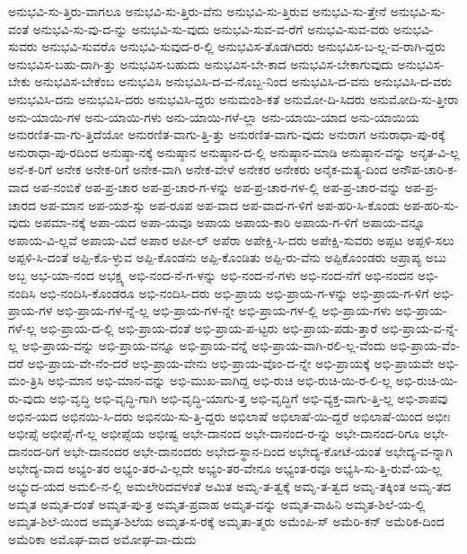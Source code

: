 {ಅನುಭವಿ-ಸು-ತ್ತಿರು-ವಾಗಲೂ
ಅನುಭವಿ-ಸು-ತ್ತಿರು-ವೆನು
ಅನುಭವಿ-ಸು-ತ್ತಿರುವ
ಅನುಭವಿ-ಸು-ತ್ತೇನೆ
ಅನುಭವಿ-ಸು-ವಂತೆ
ಅನುಭವಿ-ಸು-ವು-ದ-ನ್ನು
ಅನುಭವಿ-ಸು-ವುದು
ಅನುಭವಿ-ಸುವ-ವ-ರೆಗೆ
ಅನುಭವಿ-ಸುವ-ವರು
ಅನುಭವಿ-ಸುವರು
ಅನುಭವಿ-ಸುವರೊ
ಅನುಭವಿ-ಸುವುದ-ರ-ಲ್ಲಿ
ಅನುಭವಿಸ-ತೊಡಗಿದರು
ಅನುಭವಿಸ-ಬ-ಲ್ಲ-ವ-ರಾಗಿ-ದ್ದರು
ಅನುಭವಿಸ-ಬಹು-ದಾಗಿ-ತ್ತು
ಅನುಭವಿಸ-ಬಹುದು
ಅನುಭವಿಸ-ಬೇ-ಕಾದ
ಅನುಭವಿಸ-ಬೇಕಾಗುವುದು
ಅನುಭವಿಸ-ಬೇಕು
ಅನುಭವಿಸ-ಬೇಕೆಂಬ
ಅನುಭವಿಸಿ
ಅನುಭವಿಸಿ-ದ-ವ-ನೊಬ್ಬ-ನಿಂದ
ಅನುಭವಿಸಿ-ದ-ವನು
ಅನುಭವಿಸಿ-ದ-ವರು
ಅನುಭವಿಸಿ-ದನು
ಅನುಭವಿಸಿ-ದರು
ಅನುಭವಿಸಿ-ದ್ದರು
ಅನುಮಂಶಿ-ಕತೆ
ಅನುಮೋ-ದಿ-ಸಿದರು
ಅನುಮೋದಿ-ಸು-ತ್ತೀರಾ
ಅನು-ಯಾಯಿ-ಗಳ
ಅನು-ಯಾಯಿ-ಗಳು
ಅನು-ಯಾಯಿ-ಗಳೆ-ಲ್ಲಾ
ಅನು-ಯಾಯಿ-ಯಾದ
ಅನು-ಯಾಯಿಯ
ಅನುರಣಿತ-ವಾ-ಗು-ತ್ತಿದೆಯೋ
ಅನುರಣಿತ-ವಾಗು-ತ್ತಿ-ತ್ತು
ಅನುರಣಿತ-ವಾಗು-ವುದು
ಅನುರಾಗ
ಅನುರಾಧಾ-ಪು-ರಕ್ಕೆ
ಅನುರಾಧಾ-ಪು-ರದಿಂದ
ಅನುಷ್ಠಾ-ನಕ್ಕೆ
ಅನುಷ್ಠಾನ
ಅನುಷ್ಠಾನ-ದ-ಲ್ಲಿ
ಅನುಷ್ಠಾನ-ಮಾಡಿ
ಅನುಷ್ಠಾನ-ವನ್ನು
ಅನೃತ-ವಿ-ಲ್ಲ
ಅನೆ-ಕ-ರಿಗೆ
ಅನೇಕ
ಅನೇಕ-ರಿಗೆ
ಅನೇಕ-ವಾಗಿ
ಅನೇಕ-ವೇಳೆ
ಅನೇಕರ
ಅನೇಕರು
ಅನೈಕ-ಮತ್ಯ-ದಿಂದ
ಅನೌಪ-ಚಾರಿ-ಕ-ವಾದ
ಅಪ-ನಂಬಿಕೆ
ಅಪ-ಪ್ರ-ಚಾರ
ಅಪ-ಪ್ರ-ಚಾರ-ಗ-ಳನ್ನು
ಅಪ-ಪ್ರ-ಚಾರ-ಗಳ-ಲ್ಲಿ
ಅಪ-ಪ್ರ-ಚಾರ-ವನ್ನು
ಅಪ-ಪ್ರ-ಚಾರದ
ಅಪ-ಮಾನ
ಅಪ-ಯಶ-ಸ್ಸು
ಅಪ-ರೂಪ
ಅಪ-ವಾದ
ಅಪ-ವಾದ-ಗ-ಳಿಗೆ
ಅಪ-ಹರಿ-ಸಿ-ಕೊಂಡು
ಅಪ-ಹರಿ-ಸು-ವುದು
ಅಪಮಾ-ನಕ್ಕೆ
ಅಪಾ-ಯದ
ಅಪಾ-ಯವೂ
ಅಪಾಯ
ಅಪಾಯ-ಕಾರಿ
ಅಪಾಯ-ಗ-ಳಿಗೆ
ಅಪಾಯ-ವನ್ನೂ
ಅಪಾಯ-ವಿ-ಲ್ಲವೆ
ಅಪಾಯ-ವಿದೆ
ಅಪಾರ
ಅಪೀ-ಲ್
ಅಪೆರಾ
ಅಪೇಕ್ಷಿ-ಸಿ-ದರು
ಅಪೇಕ್ಷಿ-ಸುವರು
ಅಪ್ಪಟ
ಅಪ್ಪಳಿ-ಸಲು
ಅಪ್ಪಳಿ-ಸಿ-ದಂತೆ
ಅಪ್ಪಿ-ಕೊ-ಳ್ಳುವ
ಅಪ್ಪಿ-ಕೊಂಡನು
ಅಪ್ಪಿ-ಕೊಂಡಿತು
ಅಪ್ಪಿ-ರು-ವೆನು
ಅಪ್ಪಿಕೊಂಂಡರು
ಅಪ್ರಾಪ್ಯ
ಅಬು
ಅಬ್ಬ
ಅಭ-ಯಾ-ನಂದ
ಅಭಕ್ಷ್ಯ
ಅಭಿ-ನಂದ-ನೆ-ಗ-ಳನ್ನು
ಅಭಿ-ನಂದ-ನೆ-ಗಳು
ಅಭಿ-ನಂದ-ನೆಗೆ
ಅಭಿ-ನಂದನ
ಅಭಿ-ನಂದಿಸಿ
ಅಭಿ-ನಂದಿಸಿ-ಕೊಂಡರೂ
ಅಭಿ-ನಂದಿಸಿ-ದರು
ಅಭಿ-ಪ್ರಾಯ
ಅಭಿ-ಪ್ರಾಯ-ಗ-ಳನ್ನು
ಅಭಿ-ಪ್ರಾಯ-ಗ-ಳಿಗೆ
ಅಭಿ-ಪ್ರಾಯ-ಗಳ
ಅಭಿ-ಪ್ರಾಯ-ಗಳ-ನ್ನೆ-ಲ್ಲ
ಅಭಿ-ಪ್ರಾಯ-ಗಳ-ನ್ನೇ
ಅಭಿ-ಪ್ರಾಯ-ಗಳ-ಲ್ಲಿ
ಅಭಿ-ಪ್ರಾಯ-ಗಳು
ಅಭಿ-ಪ್ರಾಯ-ಗಳೆ-ಲ್ಲ
ಅಭಿ-ಪ್ರಾಯ-ದ-ಲ್ಲಿ
ಅಭಿ-ಪ್ರಾಯ-ದಂತೆ
ಅಭಿ-ಪ್ರಾಯ-ಪ-ಟ್ಟರು
ಅಭಿ-ಪ್ರಾಯ-ಪಡು-ತ್ತಾರೆ
ಅಭಿ-ಪ್ರಾಯ-ವ-ನ್ನೆ-ಲ್ಲ
ಅಭಿ-ಪ್ರಾಯ-ವನ್ನು
ಅಭಿ-ಪ್ರಾಯ-ವನ್ನೂ
ಅಭಿ-ಪ್ರಾಯ-ವನ್ನೆ
ಅಭಿ-ಪ್ರಾಯ-ವಾಗಿ-ರಲಿ-ಲ್ಲ-ವೆಂದು
ಅಭಿ-ಪ್ರಾಯ-ವೆಂ-ದರೆ
ಅಭಿ-ಪ್ರಾಯ-ವೇ-ನೆಂ-ದರೆ
ಅಭಿ-ಪ್ರಾಯ-ವೇನು
ಅಭಿ-ಪ್ರಾಯ-ವೊಂ-ದ-ನ್ನೇ
ಅಭಿ-ಪ್ರಾಯಕ್ಕೆ
ಅಭಿ-ಪ್ರಾಯವೇ
ಅಭಿ-ಮಂ-ತ್ರಿಸಿ
ಅಭಿ-ಮಾನ
ಅಭಿ-ಮಾನ-ವನ್ನು
ಅಭಿ-ಮುಖ-ವಾಗಿದ್ದ
ಅಭಿ-ರುಚಿ
ಅಭಿ-ರುಚಿ-ಯಿ-ರ-ಲಿ-ಲ್ಲ
ಅಭಿ-ರುಚಿ-ಯಿ-ರು-ವುದು
ಅಭಿ-ವೃದ್ಧಿ
ಅಭಿ-ವೃದ್ಧಿ-ಗಾಗಿ
ಅಭಿ-ವೃದ್ಧಿ-ಯಾಗು-ತ್ತ
ಅಭಿ-ವೃದ್ಧಿಗೆ
ಅಭಿ-ವ್ಯಕ್ತ-ವಾಗು-ತ್ತಿ-ಲ್ಲ
ಅಭಿ-ಶಾಪವು
ಅಭಿನ-ಯದ
ಅಭಿನಯಿ-ಸಿ-ದರು
ಅಭಿನಯಿ-ಸು-ತ್ತಿ-ದ್ದರು
ಅಭಿಲಾಷೆ
ಅಭಿಲಾಷೆ-ಯಿ-ದ್ದರೆ
ಅಭಿಲಾಷೆ-ಯಿಂದ
ಅಭೀಃ
ಅಭೀಪ್ಸೆ
ಅಭೀಪ್ಸೆ-ಗೆ-ಲ್ಲ
ಅಭೀಪ್ಸೆಯ
ಅಭೀಷ್ಟ
ಅಭೇ-ದಾನಂದ
ಅಭೇ-ದಾನಂದ-ರ-ನ್ನು
ಅಭೇ-ದಾನಂದ-ರಿಗೂ
ಅಭೇ-ದಾನಂದ-ರಿಗೆ
ಅಭೇ-ದಾನಂದರ
ಅಭೇ-ದಾನಂದರು
ಅಭೇದ-ಸ್ಥಾನ-ದಿಂದ
ಅಭೇದ್ಯ-ಕೋಟೆ-ಯಂತೆ
ಅಭೇದ್ಯ-ವ-ನ್ನಾಗಿ
ಅಭೇದ್ಯ-ವಾದ
ಅಭ್ಯಂ-ತರ
ಅಭ್ಯಂ-ತರ-ವಿ-ಲ್ಲದೇ
ಅಭ್ಯಂ-ತರ-ವೇನೂ
ಅಭ್ಯಂತ-ರವೂ
ಅಭ್ಯಸಿ-ಸು-ತ್ತಿ-ರುವೆ-ಯ-ಲ್ಲ
ಅಭ್ಯುದ-ಯದ
ಅಮಲಿ-ನ-ಲ್ಲಿ
ಅಮಲೇರಿದವಳಂತೆ
ಅಮಿತ
ಅಮೃ-ತ-ತ್ವಕ್ಕೆ
ಅಮೃ-ತ-ತ್ವದ
ಅಮೃ-ತಕ್ಕಿಂತ
ಅಮೃ-ತದ
ಅಮೃತ
ಅಮೃತ-ದಂತೆ
ಅಮೃತ-ಪು-ತ್ರ
ಅಮೃತ-ಪ್ರವಾಹ
ಅಮೃತ-ವನ್ನು
ಅಮೃತ-ವಾಹಿನಿ
ಅಮೃತ-ಶಿಲೆ-ಯ-ಲ್ಲಿ
ಅಮೃತ-ಶಿಲೆ-ಯಿಂದ
ಅಮೃತ-ಶಿಲೆಯ
ಅಮೃತ-ಸ-ರಕ್ಕೆ
ಅಮೃತಾ-ತ್ಮರು
ಅಮೆಂಪಿ-ಸ್
ಅಮೆರಿ-ಕನ್
ಅಮೆರಿಕ-ದಿಂದ
ಅಮೆರಿಕಾ
ಅಮೊಘ-ವಾದ
ಅಮೋಘ-ವಾ-ದುದು
}
